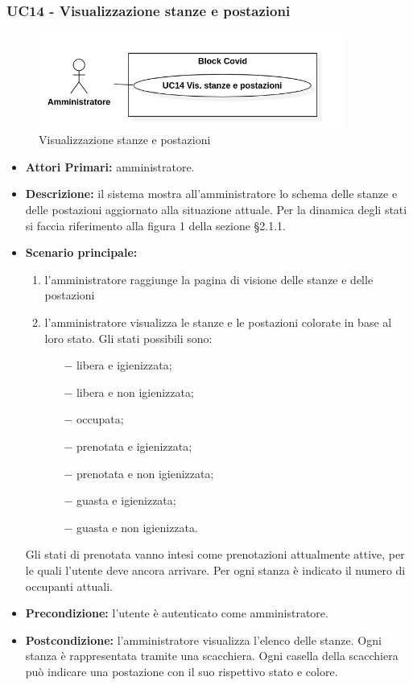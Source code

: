 \subsubsection{ UC14 - Visualizzazione stanze e postazioni}
\begin{figure}[H]
	\centering
	\includegraphics[width=10cm]{res/images/UC14.png}
	\caption{Visualizzazione stanze e postazioni}
\end{figure}
\begin{itemize}
	\item\textbf{Attori Primari:}
	amministratore.
	\item\textbf{Descrizione:}
	il sistema mostra all'amministratore lo schema delle stanze e delle postazioni aggiornato alla situazione attuale. Per la dinamica degli stati si faccia riferimento alla figura 1 della sezione §2.1.1.
	\item\textbf{Scenario principale:}
	\begin{enumerate}
		\item l'amministratore raggiunge la pagina di visione delle stanze e delle postazioni
		\item l'amministratore visualizza le stanze e le postazioni colorate in base al loro stato. Gli stati possibili sono:
		\begin{itemize}
			\item[$-$] libera e igienizzata;
			\item[$-$] libera e non igienizzata;
			\item[$-$] occupata;
			\item[$-$] prenotata e igienizzata;
			\item[$-$] prenotata e non igienizzata;
			\item[$-$] guasta e igienizzata;
			\item[$-$] guasta e non igienizzata.
		\end{itemize}
	\end{enumerate}
	Gli stati di prenotata vanno intesi come prenotazioni attualmente attive, per le quali l'utente deve ancora arrivare. \newline
	Per ogni stanza è indicato il numero di occupanti attuali.
	\item\textbf{Precondizione:} 
	l'utente è autenticato come amministratore.
	\item\textbf{Postcondizione:}
	l'amministratore visualizza l'elenco delle stanze. Ogni stanza è rappresentata tramite una scacchiera. Ogni casella della scacchiera può indicare una postazione con il suo rispettivo stato e colore.
\end{itemize}


